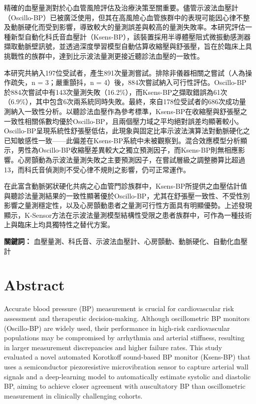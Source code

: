 \documentclass[
  12pt,
  letterpaper,
  openany,
  oneside]{book}
\begin{document}

精確的血壓量測對於心血管風險評估及治療決策至關重要。儘管示波法血壓計（Oscillo-BP）已被廣泛使用，但其在高風險心血管族群中的表現可能因心律不整及動脈硬化而受到影響，導致較大的量測誤差與較高的量測失敗率。本研究評估一種新型自動化科氏音血壓計（Ksens-BP），該裝置採用半導體壓阻式微振動感測器擷取動脈壁訊號，並透過深度學習模型自動估算收縮壓與舒張壓，旨在於臨床上具挑戰性的族群中，達到比示波法量測更接近聽診法血壓的一致性。

本研究共納入197位受試者，產生891次量測嘗試。排除非儀器相關之嘗試（人為操作疏失，n
= 3；嚴重顫抖，n =
4）後，884次嘗試納入可行性評估。Oscillo-BP於884次嘗試中有143次量測失敗（16.2\%），而Ksens-BP之擷取錯誤為61次（6.9\%），其中包含6次兩系統同時失敗。最終，來自178位受試者的686次成功量測納入一致性分析。以聽診法血壓作為參考標準，Ksens-BP在收縮壓與舒張壓之一致性相關係數均優於Oscillo-BP，且兩個壓力域之平均絕對誤差均顯著較小。Oscillo-BP呈現系統性舒張壓低估，此現象與固定比率示波法演算法對動脈硬化之已知敏感性一致------此偏差在Ksens-BP系統中未被觀察到。混合效應模型分析顯示，男性為Oscillo-BP收縮壓差異較大之獨立預測因子，而Ksens-BP則無相應影響。心房顫動為示波法量測失敗之主要預測因子，在嘗試層級之調整勝算比超過13，而科氏音偵測則不受心律不規則之影響，仍可正常運作。

在此富含動脈粥狀硬化共病之心血管門診族群中，Ksens-BP所提供之血壓估計值與聽診法量測結果的一致性顯著優於Oscillo-BP，尤其在舒張壓一致性、不受性別影響之量測穩定性，以及心房顫動患者之量測可行性方面具有明顯優勢。上述發現顯示，K-Sensor方法在示波法量測模型結構性受限之患者族群中，可作為一種技術上與臨床上均具獨特性之替代方案。

\textbf{關鍵詞：}
血壓量測、科氏音、示波法血壓計、心房顫動、動脈硬化、自動化血壓計


\chapter*{Abstract}\label{abstract}


Accurate blood pressure (BP) measurement is crucial for cardiovascular
risk assessment and therapeutic decision-making. Although oscillometric
BP monitors (Oscillo-BP) are widely used, their performance in high-risk
cardiovascular populations may be compromised by arrhythmia and arterial
stiffness, resulting in larger measurement discrepancies and higher
failure rates. This study evaluated a novel automated Korotkoff
sound-based BP monitor (Ksens-BP) that uses a semiconductor
piezoresistive microvibration sensor to capture arterial wall signals
and a deep-learning model to automatically estimate systolic and
diastolic BP, aiming to achieve closer agreement with auscultatory BP
than oscillometric measurement in clinically challenging cohorts.
\end{document}
